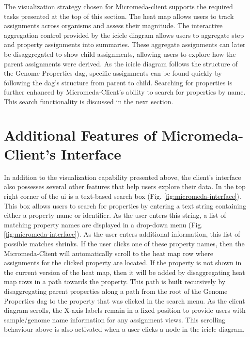 The visualization strategy chosen for Micromeda-client supports the required tasks presented at the top of this section. The heat map allows users to track assignments across organisms and assess their magnitude. The interactive aggregation control provided by the icicle diagram allows users to aggregate step and property assignments into summaries. These aggregate assignments can later be disaggregated to show child assignments, allowing users to explore how the parent assignments were derived. As the icicle diagram follows the structure of the Genome Properties \gls{dag}, specific assignments can be found quickly by following the \gls{dag}'s structure from parent to child. Searching for properties is further enhanced by Micromeda-Client's ability to search for properties by name. This search functionality is discussed in the next section.

\section{Additional Features of Micromeda-Client's Interface} \label{client-additional-features}

In addition to the visualization capability presented above, the client's interface also possesses several other features that help users explore their data. In the top right corner of the \gls{ui} is a text-based search box (Fig. \ref{fig:micromeda-interface}). This box allows users to search for properties by entering a text string containing either a property name or identifier. As the user enters this string, a list of matching property names are displayed in a drop-down menu (Fig. \ref{fig:micromeda-interface}). As the user enters additional information, this list of possible matches shrinks. If the user clicks one of these property names, then the Micromeda-Client will automatically scroll to the heat map row where assignments for the clicked property are located. If the property is not shown in the current version of the heat map, then it will be added by disaggregating heat map rows in a path towards the property. This path is built recursively by disaggregating parent properties along a path from the root of the Genome Properties \gls{dag} to the property that was clicked in the search menu. As the client diagram scrolls, the X-axis labels remain in a fixed position to provide users with sample/genome name information for any assignment views. This scrolling behaviour above is also activated when a user clicks a node in the icicle diagram.

